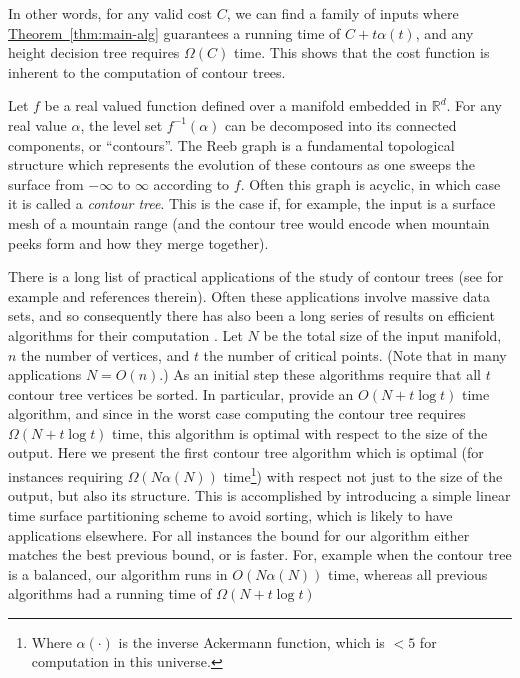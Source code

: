 \documentclass[11pt]{article}
\theoremstyle{definition}
\newcommand{\RR}{\mathbb{R}}
\newcommand{\Thm}[1]{\hyperref[thm:#1]{Theorem~\ref*{thm:#1}}} %
\begin{document}



In other words, for any valid cost $C$, we can find a family of inputs where \Thm{main-alg}
guarantees a running time of $C + t\alpha(t)$, and any height decision tree requires $\Omega(C)$ time.
This shows that the cost function is inherent to the computation of contour trees.


Let $f$ be a real valued function defined over a manifold embedded in $\RR^d$.  
For any real value $\alpha$, the level set $f^{-1}(\alpha)$ can be decomposed into its connected components, or ``contours''.
The Reeb graph is a fundamental topological structure which represents the evolution of these contours as one sweeps the surface 
from $-\infty$ to $\infty$ according to $f$.  Often this graph is acyclic, in which case it is 
called a \emph{contour tree}.  This is the case if, for example, the input is a surface mesh of a mountain range 
(and the contour tree would encode when mountain peeks form and how they merge together).

There is a long list of practical applications of the study of contour trees (see for example \cite{c-tmi-04} and references therein).
Often these applications involve massive data sets, and so consequently there has also been a long series 
of results on efficient algorithms for their computation \cite{kobps-ctsssit-97,tv-cct-98,csa-cctad-00,pc-ectls-02,cllr-sooscctmp-05}.
Let $N$ be the total size of the input manifold, $n$ the number of vertices, and $t$ the number of critical points. (Note that in many applications $N=O(n)$.)
As an initial step these algorithms require that all $t$ contour tree vertices be sorted.  
In particular, \cite{cllr-sooscctmp-05} provide an $O(N+t\log t)$ time algorithm, and since in the worst case computing the contour tree 
requires $\Omega(N+t\log t)$ time, this algorithm is optimal with respect to the size of the output.  
Here we present the first contour tree algorithm which is optimal (for instances requiring $\Omega(N\alpha(N))$ 
time\footnote{Where $\alpha(\cdot)$ is the inverse Ackermann function, which is $< 5$ for computation in this universe.}) 
with respect not just to the size of the output, but also its structure.  This is accomplished by introducing a simple linear time 
surface partitioning scheme to avoid sorting, which is likely to have applications elsewhere.  
For all instances the bound for our algorithm either matches the best previous bound, or is faster.
For, example when the contour tree is a balanced, our algorithm runs in $O(N\alpha(N))$ time, whereas all 
previous algorithms had a running time of $\Omega(N+t\log t)$
\end{document}
